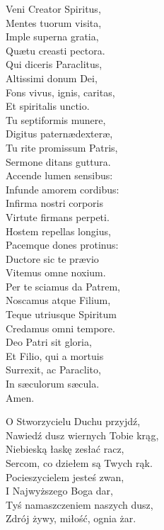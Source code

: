 \documentclass[10pt,a5paper]{book}
\newcommand{\oremuss}[2]{
	\begin{sloppypar}
		\begin{paracol}{2}
			\setlength{\columnsep}{0em}
			\begin{leftcolumn}
				#1
			\end{leftcolumn}
			\begin{rightcolumn}
				#2
			\end{rightcolumn}
		\end{paracol}
	\end{sloppypar}}
\begin{document}
\oremuss{
	Veni Creator Spiritus,\\
	Mentes tuorum visita,\\
	Imple superna gratia,\\
	Qu\ae  tu creasti pectora.\\

	Qui diceris Paraclitus,\\
	Altissimi donum Dei,\\
	Fons vivus, ignis, caritas,\\
	Et spiritalis unctio.\\

	Tu septiformis munere,\\
	Digitus patern\ae  dexter\ae ,\\
	Tu rite promissum Patris,\\
	Sermone ditans guttura.\\

	Accende lumen sensibus:\\
	Infunde amorem cordibus:\\
	Infirma nostri corporis\\
	Virtute firmans perpeti.\\

	Hostem repellas longius,\\
	Pacemque dones protinus:\\
	Ductore sic te pr\ae vio\\
	Vitemus omne noxium.\\

	Per te sciamus da Patrem,\\
	Noscamus atque Filium,\\
	Teque utriusque Spiritum\\
	Credamus omni tempore.\\

	Deo Patri sit gloria,\\
	Et Filio, qui a mortuis\\
	Surrexit, ac Paraclito,\\
	In s\ae culorum s\ae cula.\\
	Amen.}{
	O Stworzycielu Duchu przyjdź,\\
	Nawiedź dusz wiernych Tobie krąg,\\
	Niebieską łaskę zesłać racz,\\
	Sercom, co dziełem są Twych rąk.\\

	Pocieszycielem jesteś zwan,\\
	I Najwyższego Boga dar,\\
	Tyś namaszczeniem naszych dusz,\\
	Zdrój żywy, miłość, ognia żar.\\

}
\end{document}

